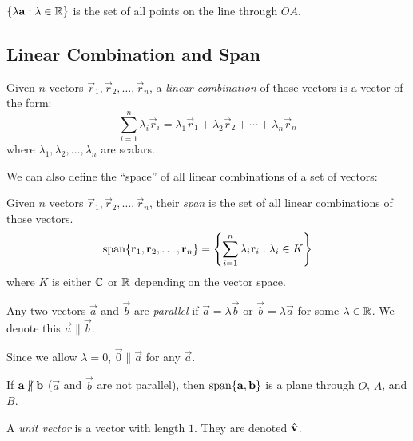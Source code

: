 \documentclass[../main.tex]{subfiles}
\begin{document}
\begin{center}
\end{center}
\begin{remark}[Note]
  $\{\lambda \boldsymbol{\mathbf{a}}: \lambda \in \mathbb{R}\}$ is the set of all points on the line through $OA$.
\end{remark}

\subsection{Linear Combination and Span}
\begin{definition}
  Given $n$ vectors $\vec{r}_1, \vec{r}_2, \ldots, \vec{r}_n$, a \textit{linear combination} of those vectors is a vector of the form:
  \[
    \sum_{i = 1}^{n} \lambda_i \vec{r}_i  = \lambda_1 \vec{r}_1 + \lambda_2 \vec{r}_2 + \cdots + \lambda_n \vec{r}_n
  \]
  where $\lambda_1, \lambda_2, \ldots, \lambda_n$ are scalars.
\end{definition}
We can also define the ``space'' of all linear combinations of a set of vectors:
\begin{definition}[Span]
  Given $n$ vectors $\vec{r}_1, \vec{r}_2, \ldots, \vec{r}_n$, their \textit{span} is the set of all linear combinations of those vectors.
  \[
    \operatorname{span}\{\boldsymbol{\mathbf{r}}_1, \boldsymbol{\mathbf{r}}_2, \ldots, \boldsymbol{\mathbf{r}}_n\} = \left\{\sum_{i = 1}^{n} \lambda_i \boldsymbol{\mathbf{r}}_i : \lambda_i \in K\right\}
  \]
  where $K$ is either $\mathbb{C}$ or $\mathbb{R}$ depending on the vector space.
\end{definition}
\begin{definition}[Parallel]
  Any two vectors $\vec{a}$ and $\vec{b}$ are \textit{parallel} if $\vec{a} = \lambda \vec{b}$ or $\vec{b} = \lambda \vec{a}$ for some $\lambda \in \mathbb{R}$.
  We denote this $\vec{a} \parallel \vec{b}$.
\end{definition}
\begin{remark}[Note]
  Since we allow $\lambda = 0$, $\vec{0} \parallel \vec{a}$ for any $\vec{a}$.
\end{remark}
If $\vec{a} \centernot\parallel \vec{b}$ ($\vec{a}$ and $\vec{b}$ are not parallel), then $\operatorname{span}\{\boldsymbol{\mathbf{a}}, \boldsymbol{\mathbf{b}}\}$ is a plane through $O$, $A$, and $B$.
\begin{definition}
  A \textit{unit vector} is a vector with length $1$.
  They are denoted $\hat{\mathbf{v}}$.
\end{definition}
\end{document}
